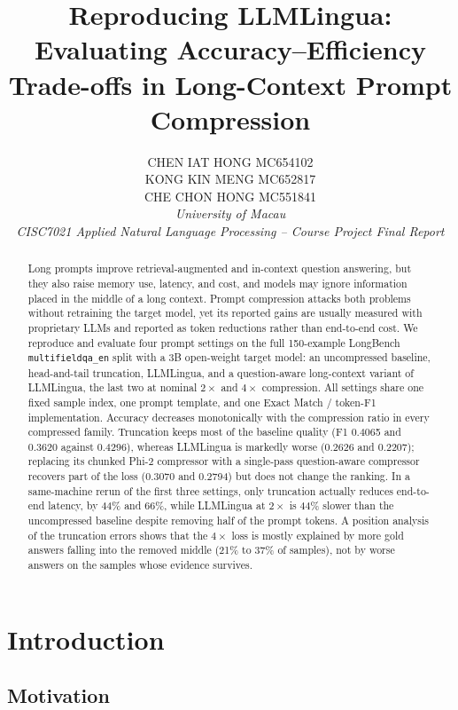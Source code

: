 \documentclass[10pt,a4paper,twocolumn]{article}
\title{Reproducing LLMLingua: Evaluating Accuracy--Efficiency Trade-offs in Long-Context Prompt Compression}
\author{
CHEN IAT HONG \quad MC654102\\
KONG KIN MENG \quad MC652817\\
CHE CHON HONG \quad MC551841\\
\textit{University of Macau}\\
\textit{CISC7021 Applied Natural Language Processing -- Course Project Final Report}
}
\date{}
\begin{document}
\maketitle
\vspace{-0.8cm}

\begin{abstract}
Long prompts improve retrieval-augmented and in-context question answering, but
they also raise memory use, latency, and cost, and models may ignore information
placed in the middle of a long context. Prompt compression attacks both problems
without retraining the target model, yet its reported gains are usually measured
with proprietary LLMs and reported as token reductions rather than end-to-end
cost. We reproduce and evaluate four prompt settings on the full 150-example
LongBench \texttt{multifieldqa\_en} split with a 3B open-weight target model:
an uncompressed baseline, head-and-tail truncation, LLMLingua, and a
question-aware long-context variant of LLMLingua, the last two at nominal $2\times$
and $4\times$ compression. All settings share one fixed sample index, one prompt
template, and one Exact Match / token-F1 implementation. Accuracy decreases
monotonically with the compression ratio in every compressed family. Truncation
keeps most of the baseline quality (F1 0.4065 and 0.3620 against 0.4296), whereas
LLMLingua is markedly worse (0.2626 and 0.2207); replacing its chunked Phi-2
compressor with a single-pass question-aware compressor recovers part of the loss
(0.3070 and 0.2794) but does not change the ranking. In a same-machine rerun of
the first three settings, only truncation actually reduces end-to-end latency, by
44\% and 66\%, while LLMLingua at $2\times$ is 44\% slower than the uncompressed
baseline despite removing half of the prompt tokens. A position analysis of the
truncation errors shows that the $4\times$ loss is mostly explained by more gold
answers falling into the removed middle (21\% to 37\% of samples), not by worse
answers on the samples whose evidence survives.
\end{abstract}

\section{Introduction}

\subsection{Motivation}
\end{document}
